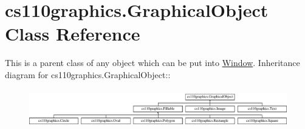 \hypertarget{classcs110graphics_1_1GraphicalObject}{
\section{cs110graphics.GraphicalObject Class Reference}
\label{classcs110graphics_1_1GraphicalObject}
}


This is a parent class of any object which can be put into \hyperlink{classcs110graphics_1_1Window}{Window}.  
Inheritance diagram for cs110graphics.GraphicalObject::\begin{figure}[H]
\begin{center}
\leavevmode
\includegraphics[height=1.68844cm]{classcs110graphics_1_1GraphicalObject}
\end{center}
\end{figure}
